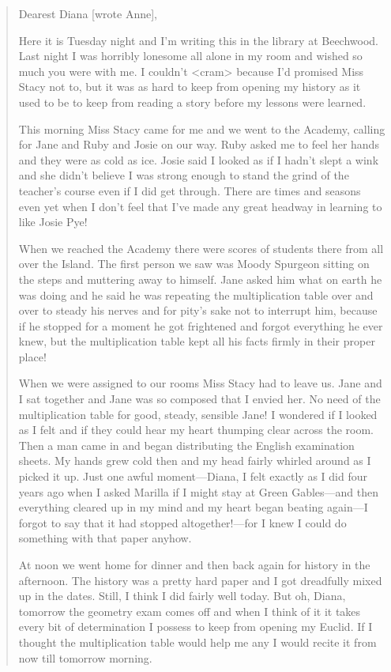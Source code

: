 \begin{quotation}
\noindent Dearest Diana [wrote Anne],

Here it is Tuesday night and I'm writing this in the library at Beechwood. Last night I was horribly lonesome all alone in my room and wished so much you were with me. I couldn't <cram> because I'd promised Miss Stacy not to, but it was as hard to keep from opening my history as it used to be to keep from reading a story before my lessons were learned.

This morning Miss Stacy came for me and we went to the Academy, calling for Jane and Ruby and Josie on our way. Ruby asked me to feel her hands and they were as cold as ice. Josie said I looked as if I hadn't slept a wink and she didn't believe I was strong enough to stand the grind of the teacher's course even if I did get through. There are times and seasons even yet when I don't feel that I've made any great headway in learning to like Josie Pye!

When we reached the Academy there were scores of students there from all over the Island. The first person we saw was Moody Spurgeon sitting on the steps and muttering away to himself. Jane asked him what on earth he was doing and he said he was repeating the multiplication table over and over to steady his nerves and for pity's sake not to interrupt him, because if he stopped for a moment he got frightened and forgot everything he ever knew, but the multiplication table kept all his facts firmly in their proper place!

When we were assigned to our rooms Miss Stacy had to leave us. Jane and I sat together and Jane was so composed that I envied her. No need of the multiplication table for good, steady, sensible Jane! I wondered if I looked as I felt and if they could hear my heart thumping clear across the room. Then a man came in and began distributing the English examination sheets. My hands grew cold then and my head fairly whirled around as I picked it up. Just one awful moment—Diana, I felt exactly as I did four years ago when I asked Marilla if I might stay at Green Gables—and then everything cleared up in my mind and my heart began beating again—I forgot to say that it had stopped altogether!—for I knew I could do something with that paper anyhow.

At noon we went home for dinner and then back again for history in the afternoon. The history was a pretty hard paper and I got dreadfully mixed up in the dates. Still, I think I did fairly well today. But oh, Diana, tomorrow the geometry exam comes off and when I think of it it takes every bit of determination I possess to keep from opening my Euclid. If I thought the multiplication table would help me any I would recite it from now till tomorrow morning.


\end{quotation}
